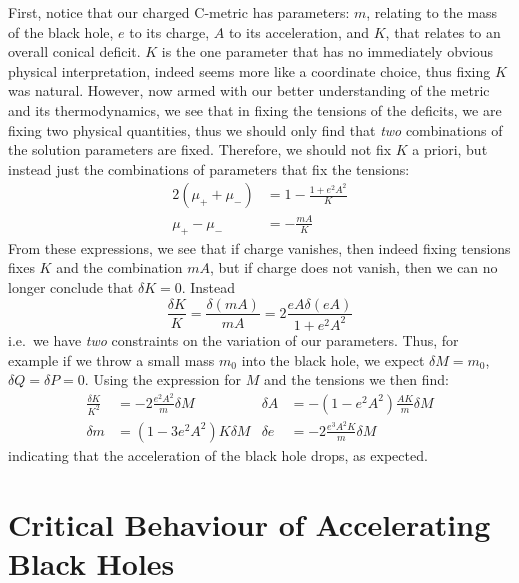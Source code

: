 \documentclass[
twoside,openright,frontopenright]{dmathesis}
\begin{document}
First, notice that our charged C-metric has parameters: $m$, relating to the
mass of the black hole, $e$ to its charge, $A$ to its acceleration, and $K$,
that relates to an overall conical deficit. $K$ is the one parameter that has no
immediately obvious physical interpretation, indeed seems more like a coordinate
choice, thus fixing $K$ was natural. However, now armed with our better
understanding of the metric and its thermodynamics, we see that in fixing the
tensions of the deficits, we are fixing two physical quantities, thus we should
only find that {\it two} combinations of the solution parameters are
fixed. Therefore, we should not fix $K$ a priori, but instead just the
combinations of parameters that fix the tensions:
\begin{equation}
\begin{aligned}
2(\mu_++\mu_-) &= 1 - \frac{1+e^2A^2}{K} \\
\mu_+ - \mu_- &= - \frac{mA}{K}
\end{aligned}
\end{equation}
From these expressions, we see that if charge vanishes, then indeed fixing
tensions fixes $K$ and the combination $mA$, but if charge does not vanish, then
we can no longer conclude that $\delta K=0$. Instead
\begin{equation}
  \frac{\delta K}{K} = \frac{\delta (mA)}{mA} = 2\frac{eA\delta (eA)}{1+e^2A^2}
\end{equation}
i.e.\ we have {\it two} constraints on the variation of our parameters.  Thus,
for example if we throw a small mass $m_0$ into the black hole, we expect
$\delta M = m_0$, $\delta Q=\delta P = 0$. Using the expression for $M$ and the
tensions we then find:
\begin{equation}
\begin{aligned}
\frac{\delta K}{K^2} &= - 2 \frac{e^2 A^2}{m}\delta M &
\delta A &= - (1-e^2 A^2) \frac{AK}{m} \delta M\\
\delta m &= (1- 3 e^2 A^2) K \delta M&
\delta e &= -2\frac{e^3A^2K}{m} \delta M
\end{aligned}
\end{equation}
indicating that the acceleration of the black hole drops, as expected.

\section{Critical Behaviour of Accelerating Black Holes}
\end{document}
